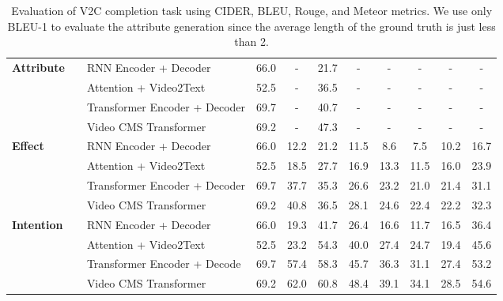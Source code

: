 \begin{table*}[t]
\begin{center}
{\begin{tabular}{@{}p{1.7cm}c  p{5.7cm} c c cccc c c }
        \multirow{4}{*}{{\normalsize {\textbf{Attribute}}}} 
        && RNN Encoder + Decoder & 66.0 & - & 21.7 & - & - & - & - & -  \\
        && Attention + Video2Text  & 52.5  & - & 36.5 & - & - & - & - & - \\
        && Transformer Encoder + Decoder  & 69.7 & - & 40.7 & - & - & - & - & -\\
        && Video CMS Transformer & 69.2 & -  & 47.3 & - & - & - & - & -\\
        \hline
        \multirow{4}{*}{{\normalsize {\textbf{Effect}}}} 
        && RNN Encoder + Decoder  & 66.0  & 12.2 & 21.2 & 11.5 & 8.6 & 7.5 & 10.2 & 16.7  \\
        && Attention + Video2Text & 52.5  & 18.5 & 27.7 & 16.9 & 13.3 & 11.5 & 16.0 & 23.9  \\
        && Transformer Encoder + Decoder & 69.7  & 37.7 & 35.3 & 26.6 & 23.2 & 21.0 & 21.4 & 31.1  \\
        && Video CMS Transformer & 69.2 & 40.8 & 36.5 & 28.1 & 24.6 & 22.4 & 22.2 & 32.3  \\
        \hline
        \multirow{4}{*}{{\normalsize {\textbf{Intention}}}} 
        && RNN Encoder + Decoder & 66.0 & 19.3 & 41.7 & 26.4 & 16.6 & 11.7 & 16.5 & 36.4 \\
        && Attention + Video2Text  & 52.5 & 23.2 & 54.3 & 40.0 & 27.4 & 24.7 & 19.4 & 45.6 \\
        &&  Transformer Encoder + Decode & 69.7 & 57.4 & 58.3 & 45.7 & 36.3 & 31.1 & 27.4 & 53.2 \\
        && Video CMS Transformer & 69.2 & 62.0 & 60.8 & 48.4 & 39.1 & 34.1 & 28.5 & 54.6  \\
        \hline
    \end{tabular}
    }
    \end{center}
    \caption{ Evaluation of V2C completion task using CIDER, BLEU, Rouge, and Meteor metrics. We use only BLEU-1 to evaluate the attribute generation  since the average length of the ground truth is just less than 2.}

    \label{tab:automaticevaluation}
\end{table*}